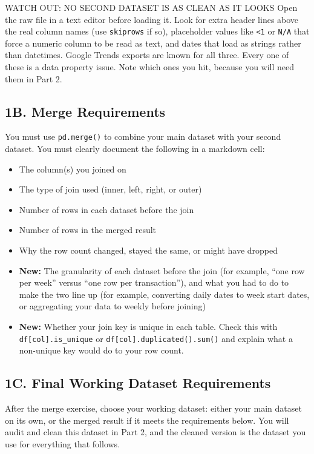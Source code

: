 \documentclass[11pt,letterpaper]{article}
\newcommand{\code}[1]{\texttt{#1}}
\begin{document}
\begin{warnbox}{WATCH OUT: NO SECOND DATASET IS AS CLEAN AS IT LOOKS}
Open the raw file in a text editor before loading it. Look for extra header lines above the real column names (use \code{skiprows} if so), placeholder values like \code{<1} or \code{N/A} that force a numeric column to be read as text, and dates that load as strings rather than datetimes. Google Trends exports are known for all three. Every one of these is a data property issue. Note which ones you hit, because you will need them in Part 2.
\end{warnbox}

\subsection{1B. Merge Requirements}

You must use \code{pd.merge()} to combine your main dataset with your second dataset. You must clearly document the following in a markdown cell:
\begin{itemize}
  \item The column(s) you joined on
  \item The type of join used (inner, left, right, or outer)
  \item Number of rows in each dataset before the join
  \item Number of rows in the merged result
  \item Why the row count changed, stayed the same, or might have dropped
  \item \textbf{New:} The granularity of each dataset before the join (for example, ``one row per week'' versus ``one row per transaction''), and what you had to do to make the two line up (for example, converting daily dates to week start dates, or aggregating your data to weekly before joining)
  \item \textbf{New:} Whether your join key is unique in each table. Check this with \code{df[col].is\_unique} or \code{df[col].duplicated().sum()} and explain what a non-unique key would do to your row count.
\end{itemize}

\subsection{1C. Final Working Dataset Requirements}

After the merge exercise, choose your working dataset: either your main dataset on its own, or the merged result if it meets the requirements below. You will audit and clean this dataset in Part 2, and the cleaned version is the dataset you use for everything that follows.
\end{document}
